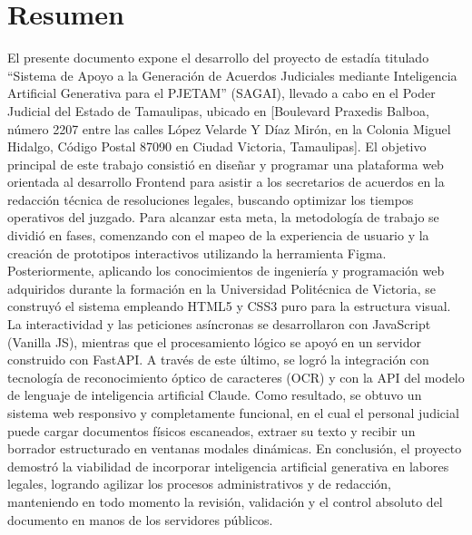\documentclass[12pt]{article}
\newcommand{\nasesorinstitucional}{Dr. Said Polanco Martagón}
\begin{document}





\clearpage
\ClearWallPaper
\thispagestyle{fancy}
\section*{Resumen}

El presente documento expone el desarrollo del proyecto de estadía titulado ``Sistema de Apoyo a la Generación de Acuerdos Judiciales mediante Inteligencia Artificial Generativa para el PJETAM'' (SAGAI), llevado a cabo en el Poder Judicial del Estado de Tamaulipas, ubicado en [Boulevard Praxedis Balboa, número 2207 entre las calles López Velarde Y Díaz Mirón, en la Colonia Miguel Hidalgo, Código Postal 87090 en Ciudad Victoria, Tamaulipas]. El objetivo principal de este trabajo consistió en diseñar y programar una plataforma web orientada al desarrollo Frontend para asistir a los secretarios de acuerdos en la redacción técnica de resoluciones legales, buscando optimizar los tiempos operativos del juzgado. Para alcanzar esta meta, la metodología de trabajo se dividió en fases, comenzando con el mapeo de la experiencia de usuario y la creación de prototipos interactivos utilizando la herramienta Figma. Posteriormente, aplicando los conocimientos de ingeniería y programación web adquiridos durante la formación en la Universidad Politécnica de Victoria, se construyó el sistema empleando HTML5 y CSS3 puro para la estructura visual. La interactividad y las peticiones asíncronas se desarrollaron con JavaScript (Vanilla JS), mientras que el procesamiento lógico se apoyó en un servidor construido con FastAPI. A través de este último, se logró la integración con tecnología de reconocimiento óptico de caracteres (OCR) y con la API del modelo de lenguaje de inteligencia artificial Claude. Como resultado, se obtuvo un sistema web responsivo y completamente funcional, en el cual el personal judicial puede cargar documentos físicos escaneados, extraer su texto y recibir un borrador estructurado en ventanas modales dinámicas. En conclusión, el proyecto demostró la viabilidad de incorporar inteligencia artificial generativa en labores legales, logrando agilizar los procesos administrativos y de redacción, manteniendo en todo momento la revisión, validación y el control absoluto del documento en manos de los servidores públicos.
\end{document}
